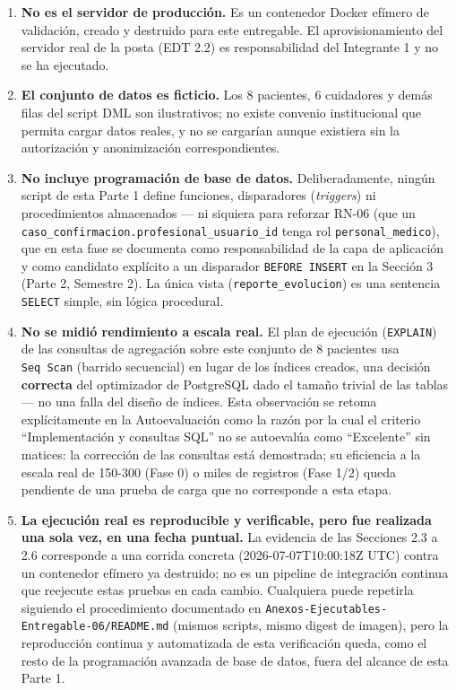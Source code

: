 \documentclass[11pt,a4paper]{article}
\providecommand{\tightlist}{%
  \setlength{\itemsep}{0pt}\setlength{\parskip}{0pt}}
\begin{document}
\begin{enumerate}
\def\labelenumi{\arabic{enumi}.}
\tightlist
\item
  \textbf{No es el servidor de producción.} Es un contenedor Docker efímero de validación, creado y destruido para este entregable. El aprovisionamiento del servidor real de la posta (EDT 2.2) es responsabilidad del Integrante 1 y no se ha ejecutado.
\item
  \textbf{El conjunto de datos es ficticio.} Los 8 pacientes, 6 cuidadores y demás filas del script DML son ilustrativos; no existe convenio institucional que permita cargar datos reales, y no se cargarían aunque existiera sin la autorización y anonimización correspondientes.
\item
  \textbf{No incluye programación de base de datos.} Deliberadamente, ningún script de esta Parte 1 define funciones, disparadores (\emph{triggers}) ni procedimientos almacenados --- ni siquiera para reforzar RN-06 (que un \texttt{caso\_confirmacion.profesional\_usuario\_id} tenga rol \texttt{personal\_medico}), que en esta fase se documenta como responsabilidad de la capa de aplicación y como candidato explícito a un disparador \texttt{BEFORE\ INSERT} en la Sección 3 (Parte 2, Semestre 2). La única vista (\texttt{reporte\_evolucion}) es una sentencia \texttt{SELECT} simple, sin lógica procedural.
\item
  \textbf{No se midió rendimiento a escala real.} El plan de ejecución (\texttt{EXPLAIN}) de las consultas de agregación sobre este conjunto de 8 pacientes usa \texttt{Seq\ Scan} (barrido secuencial) en lugar de los índices creados, una decisión \textbf{correcta} del optimizador de PostgreSQL dado el tamaño trivial de las tablas --- no una falla del diseño de índices. Esta observación se retoma explícitamente en la Autoevaluación como la razón por la cual el criterio ``Implementación y consultas SQL'' no se autoevalúa como ``Excelente'' sin matices: la corrección de las consultas está demostrada; su eficiencia a la escala real de 150-300 (Fase 0) o miles de registros (Fase 1/2) queda pendiente de una prueba de carga que no corresponde a esta etapa.
\item
  \textbf{La ejecución real es reproducible y verificable, pero fue realizada una sola vez, en una fecha puntual.} La evidencia de las Secciones 2.3 a 2.6 corresponde a una corrida concreta (2026-07-07T10:00:18Z UTC) contra un contenedor efímero ya destruido; no es un pipeline de integración continua que reejecute estas pruebas en cada cambio. Cualquiera puede repetirla siguiendo el procedimiento documentado en \texttt{Anexos-Ejecutables-Entregable-06/README.md} (mismos scripts, mismo digest de imagen), pero la reproducción continua y automatizada de esta verificación queda, como el resto de la programación avanzada de base de datos, fuera del alcance de esta Parte 1.
\end{enumerate}
\end{document}
